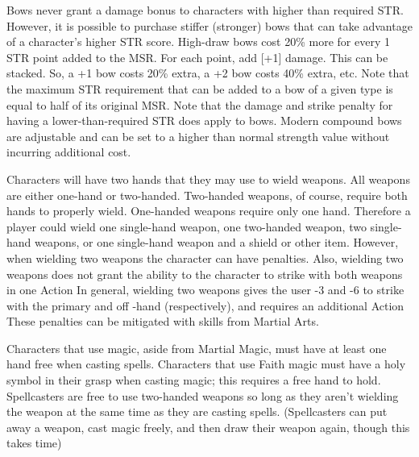 \documentclass[twoside]{book}
\begin{document}
  
    {  
     Bows never grant a damage bonus to characters with
               higher than required STR. However, it is possible to
               purchase stiffer (stronger) bows that can take advantage
               of a character's higher STR score. High-draw bows
               cost 20\% more for every 1 STR point added to the MSR. For
               each point, add [+1] damage. This can be stacked. So, a +1
               bow costs 20\% extra, a +2 bow costs 40\% extra, etc. Note
               that the maximum STR requirement that can be added to a
               bow of a given type is equal to half of its original MSR.
               Note that the damage and strike penalty for having a
               lower-than-required STR does apply to bows. Modern
               compound bows are adjustable and can be set to a higher
               than normal strength value without incurring additional
               cost. 
    }
  
    {  
     Characters will have two hands that they may use to
               wield weapons. All weapons are either one-hand or
               two-handed. Two-handed weapons, of course, require both
               hands to properly wield. One-handed weapons require only
               one hand. Therefore a player could wield one single-hand
               weapon, one two-handed weapon, two single-hand weapons, or
               one single-hand weapon and a shield or other item.
               However, when wielding two weapons the character can have
               penalties. Also, wielding two weapons does not grant the
               ability to the character to strike with both weapons in
               one Action In general, wielding two weapons gives the user
               -3 and -6 to strike with the primary and off -hand
               (respectively), and requires an additional Action These
               penalties can be mitigated with skills from Martial Arts.
               
    }
  
    {  
     Characters that use magic, aside from Martial Magic,
               must have at least one hand free when casting spells.
               Characters that use Faith magic must have a holy symbol in
               their grasp when casting magic; this requires a free hand
               to hold. Spellcasters are free to use two-handed weapons
               so long as they aren't wielding the weapon at the
               same time as they are casting spells. (Spellcasters can
               put away a weapon, cast magic freely, and then draw their
               weapon again, though this takes time) 
    }
  
\end{document}
